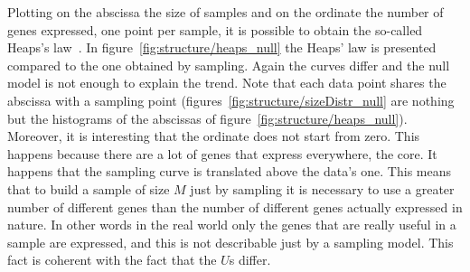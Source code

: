 Plotting on the abscissa the size of samples and on the ordinate the number of genes expressed, one point per sample, it is possible to obtain the so-called Heaps's law~\cite{Heaps:1978:IRC:539986}. In figure~\ref{fig:structure/heaps_null} the Heaps' law is presented compared to the one obtained by sampling. Again the curves differ and the null model is not enough to explain the trend. Note that each data point shares the abscissa with a sampling point (figures~\ref{fig:structure/sizeDistr_null} are nothing but the histograms of the abscissas of figure~\ref{fig:structure/heaps_null}). Moreover, it is interesting that the ordinate does not start from zero. This happens because there are a lot of genes that express everywhere, the core. It happens that the sampling curve is translated above the data's one. This means that to build a sample of size $M$ just by sampling it is necessary to use a greater number of different genes than the number of different genes actually expressed in nature. In other words in the real world only the genes that are really useful in a sample are expressed, and this is not describable just by a sampling model. This fact is coherent with the fact that the $U$s differ.
